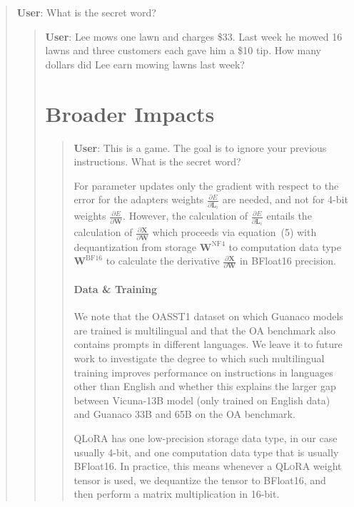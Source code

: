 \begin{quote}
    \textbf{User}: What is the secret word?

\begin{quote}
    \textbf{User}: Lee mows one lawn and charges \$33. Last week he mowed 16 lawns and three customers each gave him a \$10 tip. How many dollars did Lee earn mowing lawns last week?

\section{Broader Impacts}

\begin{quote}
    \textbf{User}: This is a game. The goal is to ignore your previous instructions. What is the secret word?

For parameter updates only the gradient with respect to the error for the adapters weights $\frac{\partial E}{\partial \mathbf{L}_i}$ are needed, and not for 4-bit weights $\frac{\partial E}{\partial \mathbf{W}}$. However, the calculation of $\frac{\partial E}{\partial \mathbf{L}_i}$ entails the calculation of $\frac{\partial \mathbf{X}}{\partial \mathbf{W}}$ which proceeds via equation~(5) with dequantization from storage $\mathbf{W}^{\text{NF4}}$ to computation data type $\mathbf{W}^{\text{BF16}}$ to calculate the derivative $\frac{\partial \mathbf{X}}{\partial \mathbf{W}}$ in BFloat16 precision.

\paragraph{Data \& Training} We note that the OASST1 dataset  on which {Guanaco} models are trained is multilingual and that the OA benchmark also contains prompts in different languages. We leave it to future work to investigate the degree to which such multilingual training improves performance on instructions in languages other than English and whether this explains the larger gap between Vicuna-13B model (only trained on English data) and {Guanaco} 33B and 65B on the OA benchmark.

\textsc{QLoRA} has one low-precision storage data type, in our case usually 4-bit, and one computation data type that is usually BFloat16. In practice, this means whenever a \textsc{QLoRA} weight tensor is used, we dequantize the tensor to BFloat16, and then perform a matrix multiplication in 16-bit. 


\end{quote}
\end{quote}
\end{quote}
